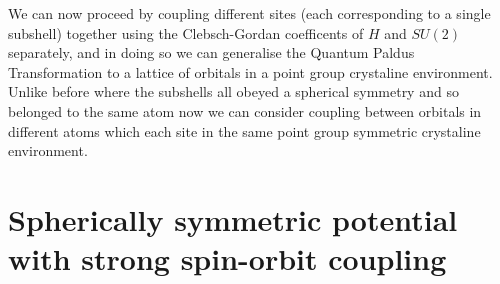 \documentclass{article}
\begin{document}

We can now proceed by coupling different sites (each corresponding to a single subshell) together using the Clebsch-Gordan coefficents of $H$ and $SU(2)$ separately, and in doing so we can generalise the Quantum Paldus Transformation to a lattice of orbitals in a point group crystaline environment. Unlike before where the subshells all obeyed a spherical symmetry and so belonged to the same atom now we can consider coupling between orbitals in different atoms which each site in the same point group symmetric crystaline environment.
\section{Spherically symmetric potential with strong spin-orbit coupling}
\end{document}
